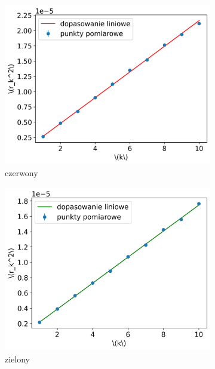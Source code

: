 \documentclass[12pt]{article}
\begin{document}
\begin{figure}[H]
	\centering
	\begin{subfigure}{0.3\textwidth}
		\centering
		\includegraphics[width=\linewidth]{red}
		\caption{czerwony}
		\label{fig:red_line}
	\end{subfigure}
	\hfill
	\begin{subfigure}{0.3\textwidth}
		\centering
		\includegraphics[width=\linewidth]{green}
		\caption{zielony}
		\label{fig:green_line}
	\end{subfigure}
	\hfill
	\begin{subfigure}{0.3\textwidth}
		\centering

\end{subfigure}
\end{figure}
\end{document}
